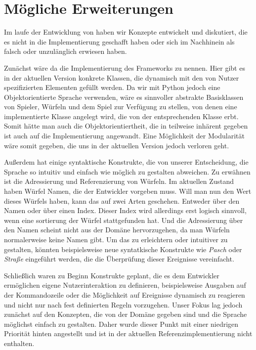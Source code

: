 \section{Mögliche Erweiterungen} %
\label{sec:mogliche_erweiterungen}
	Im laufe der Entwicklung von \dg haben wir Konzepte entwickelt und diskutiert, die es nicht in die Implementierung geschafft haben oder sich im Nachhinein als falsch oder unzulänglich erwiesen haben.
	
	Zunächst wäre da die Implementierung des Frameworks zu nennen. Hier gibt es in der aktuellen Version konkrete Klassen, die dynamisch mit den von Nutzer spezifizierten Elementen gefüllt werden. Da wir mit Python jedoch eine Objektorientierte Sprache verwenden, wäre es sinnvoller abstrakte Basisklassen von Spieler, Würfeln und dem Spiel zur Verfügung zu stellen, von denen eine implementierte Klasse angelegt wird, die von der entsprechenden Klasse erbt. Somit hätte man auch die Objektorientiertheit, die in \dg teilweise inhärent gegeben ist auch auf die Implementierung angewandt. Eine Möglichkeit der Modularität wäre somit gegeben, die uns in der aktuellen Version jedoch verloren geht.
	
	Außerdem hat \dg einige syntaktische Konstrukte, die von unserer Entscheidung, die Sprache so intuitiv und einfach wie möglich zu gestalten abweichen. Zu erwähnen ist die Adressierung und Referenzierung von Würfeln. Im aktuellen Zustand haben Würfel Namen, die der Entwickler vorgeben muss. Will man nun den Wert dieses Würfels haben, kann das auf zwei Arten geschehen. Entweder über den Namen oder über einen Index. Dieser Index wird allerdings erst logisch sinnvoll, wenn eine sortierung der Würfel stattgefunden hat. Und die Adressierung über den Namen scheint nicht aus der Domäne hervorzugehen, da man Würfeln normalerweise keine Namen gibt. Um das zu erleichtern oder intuitiver zu gestalten, könnten beispielsweise neue syntatkische Konstrukte wie \emph{Pasch} oder \emph{Straße} eingeführt werden, die die Überprüfung dieser Ereignisse vereinfacht.
	
	Schließlich waren zu Beginn Konstrukte geplant, die es dem Entwickler ermöglichen eigene Nutzerinteraktion zu definieren, beispielsweise Ausgaben auf der Kommandozeile oder die Möglichkeit auf Ereignisse dynamisch zu reagieren und nicht nur nach fest definierten Regeln vorzugehen. Unser Fokus lag jedoch zunächst auf den Konzepten, die von der Domäne gegeben sind und die Sprache möglichst einfach zu gestalten. Daher wurde dieser Punkt mit einer niedrigen Priorität hinten angestellt und ist in der aktuellen Referenzimplementierung nicht enthalten.
    













